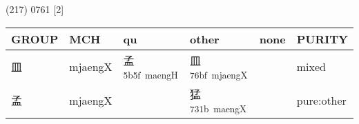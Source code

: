 \documentclass[14pt,a4paper]{scrartcl}
\begin{document}
(217) 0761 {[}2{]}

\begin{longtable}[c]{@{}llllll@{}}
\toprule
\begin{minipage}[b]{0.14\columnwidth}\raggedright\strut
GROUP
\strut\end{minipage} &
\begin{minipage}[b]{0.14\columnwidth}\raggedright\strut
MCH
\strut\end{minipage} &
\begin{minipage}[b]{0.14\columnwidth}\raggedright\strut
qu
\strut\end{minipage} &
\begin{minipage}[b]{0.14\columnwidth}\raggedright\strut
other
\strut\end{minipage} &
\begin{minipage}[b]{0.14\columnwidth}\raggedright\strut
none
\strut\end{minipage} &
\begin{minipage}[b]{0.14\columnwidth}\raggedright\strut
PURITY
\strut\end{minipage}\tabularnewline
\midrule
\endhead
\begin{minipage}[t]{0.14\columnwidth}\raggedright\strut
皿
\strut\end{minipage} &
\begin{minipage}[t]{0.14\columnwidth}\raggedright\strut
mjaengX
\strut\end{minipage} &
\begin{minipage}[t]{0.14\columnwidth}\raggedright\strut
孟\textsuperscript{5b5f~maengH}
\strut\end{minipage} &
\begin{minipage}[t]{0.14\columnwidth}\raggedright\strut
皿\textsuperscript{76bf~mjaengX}
\strut\end{minipage} &
\begin{minipage}[t]{0.14\columnwidth}\raggedright\strut
\strut\end{minipage} &
\begin{minipage}[t]{0.14\columnwidth}\raggedright\strut
mixed
\strut\end{minipage}\tabularnewline
\begin{minipage}[t]{0.14\columnwidth}\raggedright\strut
孟
\strut\end{minipage} &
\begin{minipage}[t]{0.14\columnwidth}\raggedright\strut
mjaengX
\strut\end{minipage} &
\begin{minipage}[t]{0.14\columnwidth}\raggedright\strut
\strut\end{minipage} &
\begin{minipage}[t]{0.14\columnwidth}\raggedright\strut
猛\textsuperscript{731b~maengX}
\strut\end{minipage} &
\begin{minipage}[t]{0.14\columnwidth}\raggedright\strut
\strut\end{minipage} &
\begin{minipage}[t]{0.14\columnwidth}\raggedright\strut
pure:other
\strut\end{minipage}\tabularnewline
\bottomrule
\end{longtable}
\end{document}
